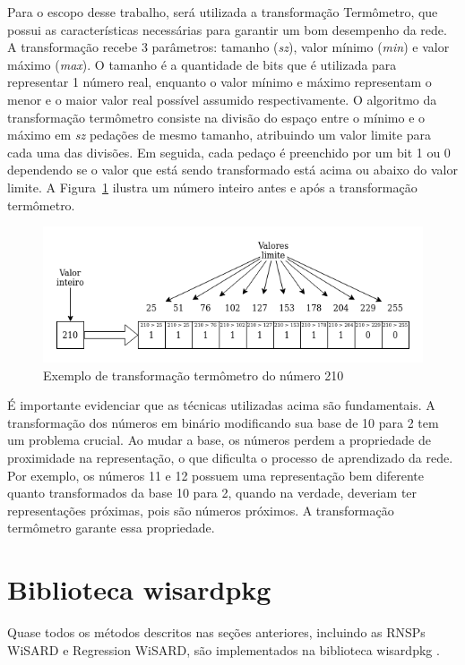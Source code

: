 Para o escopo desse trabalho, será utilizada a transformação Termômetro, que possui as características necessárias para garantir um bom desempenho da rede. A transformação recebe 3 parâmetros: tamanho (\textit{sz}), valor mínimo (\textit{min}) e valor máximo (\textit{max}). O tamanho é a quantidade de bits que é utilizada para representar 1 número real, enquanto o valor mínimo e máximo representam o menor e o maior valor real possível assumido respectivamente. O algoritmo da transformação termômetro consiste na divisão do espaço entre o mínimo e o máximo em \textit{sz} pedações de mesmo tamanho, atribuindo um valor limite para cada uma das divisões. Em seguida, cada pedaço é preenchido por um bit 1 ou 0 dependendo se o valor que está sendo transformado está acima ou abaixo do valor limite. A Figura~\ref{fig:therm_ex} ilustra um número inteiro antes e após a transformação termômetro.

\begin{figure}[!htp] \label{fig:therm_ex}
    \centering
    \includegraphics[width=5.0in]{img/therm_example.png}
    \caption{Exemplo de transformação termômetro do número 210}
\end{figure}

É importante evidenciar que as técnicas utilizadas acima são fundamentais. A transformação dos números em binário modificando sua base de 10 para 2 tem um problema crucial. Ao mudar a base, os números perdem a propriedade de proximidade na representação, o que dificulta o processo de aprendizado da rede. Por exemplo, os números 11 e 12 possuem uma representação bem diferente quanto transformados da base 10 para 2, quando na verdade, deveriam ter representações próximas, pois são números próximos. A transformação termômetro garante essa propriedade.

\section{Biblioteca wisardpkg} \label{sec:wisardpkg}
Quase todos os métodos descritos nas seções anteriores, incluindo as RNSPs WiSARD e Regression WiSARD, são implementados na biblioteca wisardpkg \cite{wisardpkg}.

